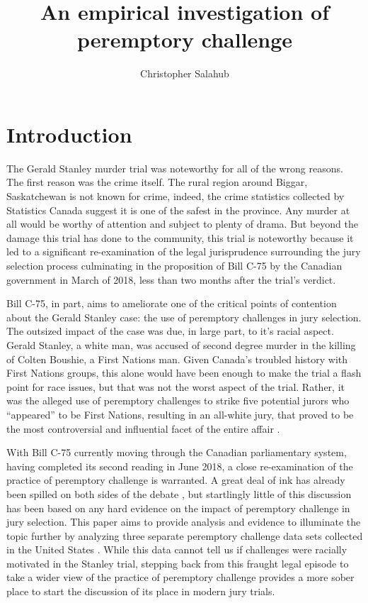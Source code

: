 \documentclass{article}
\title{An empirical investigation of peremptory challenge}
\author{Christopher Salahub}
\begin{document}
\maketitle

\section{Introduction} \label{sec:Intro}

The Gerald Stanley murder trial was noteworthy for all of the wrong reasons. The first reason was the crime itself. The rural
region around Biggar, Saskatchewan\cite{StanleyWitnessAccounts} is not known for crime, indeed, the crime statistics collected by
Statistics Canada suggest it is one of the safest in the province\cite{SaskatchewanCrime}. Any murder at all would be worthy of
attention and subject to plenty of drama. But beyond the damage this trial has done to the community, this trial is noteworthy
because it led to a significant re-examination of the legal jurisprudence surrounding the jury selection process culminating in
the proposition of Bill C-75 by the Canadian government in March of 2018\cite{billc75}, less than two months after the trial's
verdict\cite{GeraldStanleyVerdict}.

Bill C-75, in part, aims to ameliorate one of the critical points of contention about the Gerald Stanley case: the use of
peremptory challenges in jury selection. The outsized impact of the case was due, in large part, to it's racial aspect. Gerald
Stanley, a white man, was accused of second degree murder in the killing of Colten Boushie, a First Nations man. Given Canada's
troubled history with First Nations groups, this alone would have been enough to make the trial a flash point for race issues, but
that was not the worst aspect of the trial. Rather, it was the alleged use of peremptory challenges to strike five potential
jurors who ``appeared'' to be First Nations, resulting in an all-white jury, that proved to be the most controversial and
influential facet of the entire affair\cite{fiverejected} \cite{fraughthistory}.

With Bill C-75 currently moving through the Canadian parliamentary system, having completed its second reading in June
2018\cite{c75legisinfo}, a close re-examination of the practice of peremptory challenge is warranted. A great deal of ink has
already been spilled on both sides of the debate \cite{peremparegood} \cite{bothwrong} \cite{goodfirststep}, but startlingly
little of this discussion has been based on any hard evidence on the impact of peremptory challenge in jury selection. This paper
aims to provide analysis and evidence to illuminate the topic further by analyzing three separate peremptory challenge
data sets collected in the United States \cite{JurySunshineProj} \cite{StubbornLegacy} \cite{PerempChalMurder}. While this data
cannot tell us if challenges were racially motivated in the Stanley trial, stepping back from this fraught legal episode to take a
wider view of the practice of peremptory challenge provides a more sober place to start the discussion of its place in modern jury
trials.
\end{document}
